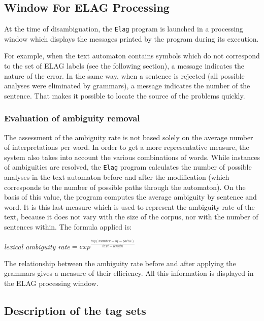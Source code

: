 \subsection{Window For ELAG Processing}
At the time of disambiguation, the \verb+Elag+ program
 is launched in a processing window which displays the
messages printed by the program during its execution.

\bigskip
\noindent For example, when the text automaton contains symbols which do not correspond to
the set of ELAG labels (see the following section), a message indicates the
nature of the error. In the same way, when a sentence is rejected (all possible
analyses were eliminated by grammars), a message indicates the number of the
sentence. That makes it possible to locate the source of the problems quickly.


\subsubsection{Evaluation of ambiguity removal}
The assessment of the ambiguity rate is not based solely on the average number
of interpretations per word. In order to get a more representative measure, the
system also takes into account the various combinations of words. While instances
of ambiguities are resolved, the \verb+Elag+ program calculates the number of
possible analyses in the text automaton before and after the modification (which
corresponds to the number of possible paths through the automaton). On the basis
of this value, the program computes the average ambiguity by sentence and word.
It is this last measure which is used to represent the ambiguity rate of the 
text, because it does not vary with the size of the corpus, nor with the number of
sentences within. The formula applied is:


\bigskip
\begin{center}
\textit{lexical ambiguity rate}$=exp^{\frac{log(number-of-paths)}{text-length}}$
\end{center}

\bigskip \noindent The relationship between the ambiguity rate before and
after applying the grammars gives a measure of their efficiency. All this
information is displayed in the ELAG processing window.


\subsection{Description of the tag sets}
\label{section-elag-tagset}

